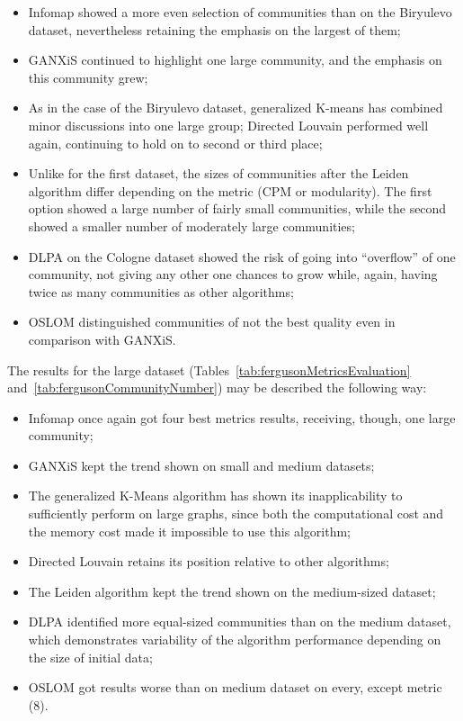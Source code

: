 \begin{itemize}
	\item Infomap showed a more even selection of communities than on the Biryulevo dataset, nevertheless retaining the emphasis on the largest of them;
	\item GANXiS continued to highlight one large community, and the emphasis on this community grew;
	\item As in the case of the Biryulevo dataset, generalized K-means has combined minor discussions into one large group;
	Directed Louvain performed well again, continuing to hold on to second or third place;
	\item Unlike for the first dataset, the sizes of communities after the Leiden algorithm differ depending on the metric (CPM or modularity). The first option showed a large number of fairly small communities, while the second showed a smaller number of moderately large communities;
	\item DLPA on the Cologne dataset showed the risk of going into “overflow” of one community, not giving any other one chances to grow while, again, having twice as many	communities as other algorithms;
	\item OSLOM distinguished communities of not the best quality even in comparison with	GANXiS.
\end{itemize}

The results for the large dataset (Tables~\cref{tab:fergusonMetricsEvaluation} and~\cref{tab:fergusonCommunityNumber}) may be described the following way:

\begin{itemize}
	\item Infomap once again got four best metrics results, receiving, though, one large community;
	\item GANXiS kept the trend shown on small and medium datasets;
	\item The generalized K-Means algorithm has shown its inapplicability to sufficiently perform on large graphs, since both the computational cost and the memory cost made it impossible to use this algorithm;
	\item Directed Louvain retains its position relative to other algorithms;
	\item The Leiden algorithm kept the trend shown on the medium-sized dataset;
	\item DLPA identified more equal-sized communities than on the medium dataset, which demonstrates variability of the algorithm performance depending on the size of initial data;
	\item OSLOM got results worse than on medium dataset on every, except metric (8).
\end{itemize}

